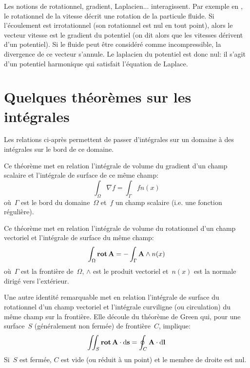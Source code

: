 \bigskip
Les notions de rotationnel, gradient, Laplacien... interagissent. Par exemple en , le rotationnel de la vitesse décrit une rotation de la particule fluide.
Si l'écoulement est irrotationnel (son rotationnel est nul en tout point), alors le vecteur vitesse est le gradient du potentiel (on dit alors que les vitesses dérivent d'un potentiel).
Si le fluide peut être considéré comme incompressible, la divergence de ce vecteur s'annule.
Le laplacien du potentiel est donc nul: il s'agit d'un potentiel harmonique qui satisfait l'équation de Laplace.

\medskip
\section{Quelques théorèmes sur les intégrales}

Les relations ci-après permettent de passer d'intégrales sur un domaine à des intégrales sur le bord de ce domaine.


\medskip
\begin{theoreme}
Ce théorème met en relation l'intégrale de volume du gradient d'un champ scalaire et l'intégrale de surface de ce même champ:
 \begin{equation}
  \int_\Omega \nabla f = \int_\Gamma f n(x)
\end{equation}
où~$\Gamma$ est le bord du domaine~$\Omega$ et~$f$ un champ scalaire (i.e. une fonction régulière).
\end{theoreme}

\medskip
\begin{theoreme}
Ce théorème met en relation l'intégrale de volume du rotationnel d'un champ vectoriel et l'intégrale de surface du même champ:
\begin{equation}
\int_\Omega \operatorname{\mathbf{rot}} \mathbf{A} =
-\int_\Gamma \mathbf{A} \wedge n(x)
\end{equation}
où~$\Gamma$ est la frontière de~$\Omega$, $\wedge$ est le produit vectoriel et~$n(x)$ est la normale dirigé vers l'extérieur.
\end{theoreme}

\medskip{}
Une autre identité remarquable met en relation l'intégrale de surface du rotationnel d'un champ vectoriel et l'intégrale curviligne (ou circulation) du même champ sur la frontière.
Elle découle du théorème de Green qui, pour une surface~$S$ (généralement non fermée) de frontière~$C$, implique:
\begin{equation}
\iint_S \operatorname{\mathbf{rot}} \mathbf{A} \cdot \text{d}\mathbf{s} = \oint_C \mathbf{A} \cdot \text{d}\mathbf{l}
\end{equation}
Si~$S$ est fermée, $C$ est vide (ou réduit à un point) et le membre de droite est nul.


